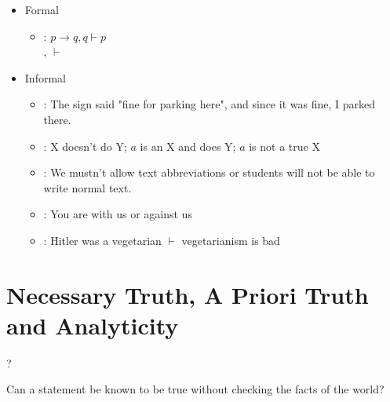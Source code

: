 \documentclass[headrule,footrule]{foils}
\begin{document}
\begin{itemize}
\item Formal
  \begin{itemize}
  \item {}: $p \rightarrow q, q \vdash p$
    \\ ,  $\vdash$ 
  \end{itemize}
\item Informal
  \begin{itemize}
  \item {}:  The sign said "fine for parking here", and since it was fine, I parked there. 
  \item {}: X doesn't do Y; $a$ is an X and does Y; $a$ is not a true X
  \item {}: We mustn't allow text abbreviations or students will not be able to write normal text.
  \item {}: You are with us or against us
  \item {}: Hitler was a vegetarian  $\vdash$ vegetarianism is bad
  \end{itemize}
\end{itemize}



\section{Necessary Truth, A Priori Truth and Analyticity}

\begin{exe}
  \ex {}
  \ex ?
\end{exe}

\noindent Can a statement be known to be true without checking the facts of the
world?
\end{document}
